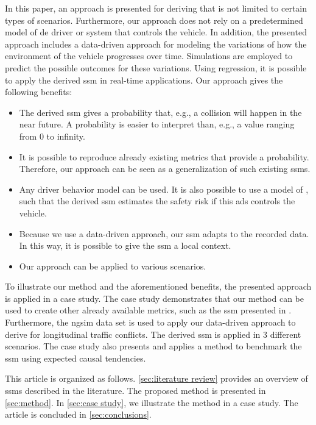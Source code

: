 In this paper, an approach is presented for deriving  that is not limited to certain types of scenarios.
Furthermore, our approach does not rely on a predetermined model of de driver or system that controls the vehicle. 
In addition, the presented approach includes a data-driven approach for modeling the variations of how the environment of the vehicle progresses over time.
Simulations are employed to predict the possible outcomes for these variations.
Using regression, it is possible to apply the derived \ac{ssm} in real-time applications.
Our approach gives the following benefits:
\begin{itemize}
	\item The derived \ac{ssm} gives a probability that, e.g., a collision will happen in the near future. 
	A probability is easier to interpret than, e.g., a value ranging from 0 to infinity.
	
	\item It is possible to reproduce already existing metrics that provide a probability. 
	Therefore, our approach can be seen as a generalization of such existing \acp{ssm}.
	
	\item Any driver behavior model can be used.
	It is also possible to use a model of , such that the derived \ac{ssm} estimates the safety risk if this \ac{ads} controls the vehicle.
	
	\item Because we use a data-driven approach, our \ac{ssm} adapts to the recorded data. 
	In this way, it is possible to give the \ac{ssm} a local context.
	
	\item Our approach can be applied to various scenarios.
\end{itemize}

To illustrate our method and the aforementioned benefits, the presented approach is applied in a case study.
The case study demonstrates that our method can be used to create other already available metrics, such as the \ac{ssm} presented in \autocite{wang2014evaluation}.
Furthermore, the \ac{ngsim} data set \autocite{kovvali2007video} is used to apply our data-driven approach to derive  for longitudinal traffic conflicts.
The derived \ac{ssm} is applied in 3 different scenarios.
The case study also presents and applies a method to benchmark the \ac{ssm} using expected causal tendencies.

This article is organized as follows.
\cref{sec:literature review} provides an overview of \acp{ssm} described in the literature.
The proposed method is presented in \cref{sec:method}.
In \cref{sec:case study}, we illustrate the method in a case study.
The article is concluded in \cref{sec:conclusions}.
